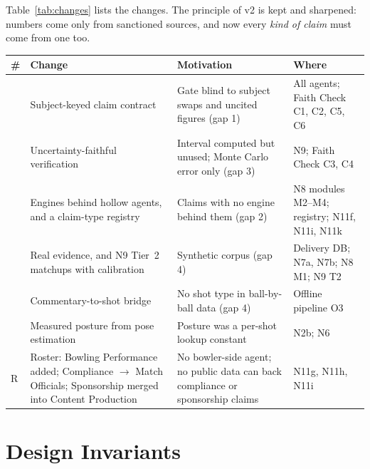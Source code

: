 \documentclass[11pt,a4paper]{article}
\begin{document}
\noindent Table~\ref{tab:changes} lists the changes. The principle of v2 is kept
and sharpened: numbers come only from sanctioned sources, and now every
\emph{kind of claim} must come from one too.

\begin{center}
\footnotesize
\renewcommand{\arraystretch}{1.25}
\begin{tabular}{@{}>{\raggedright\arraybackslash}p{0.4cm}
                  >{\raggedright\arraybackslash}p{4.4cm}
                  >{\raggedright\arraybackslash}p{6.6cm}
                  >{\raggedright\arraybackslash}p{3.6cm}@{}}
\toprule
\textbf{\#} & \textbf{Change} & \textbf{Motivation} & \textbf{Where} \\
\midrule
1 & Subject-keyed claim contract & Gate blind to subject swaps and uncited figures (gap 1) & All agents; Faith Check C1, C2, C5, C6 \\
2 & Uncertainty-faithful verification & Interval computed but unused; Monte Carlo error only (gap 3) & N9; Faith Check C3, C4 \\
3 & Engines behind hollow agents, and a claim-type registry & Claims with no engine behind them (gap 2) & N8 modules M2--M4; registry; N11f, N11i, N11k \\
4 & Real evidence, and N9 Tier~2 matchups with calibration & Synthetic corpus (gap 4) & Delivery DB; N7a, N7b; N8 M1; N9 T2 \\
5 & Commentary-to-shot bridge & No shot type in ball-by-ball data (gap 4) & Offline pipeline O3 \\
6 & Measured posture from pose estimation & Posture was a per-shot lookup constant & N2b; N6 \\
R & Roster: Bowling Performance added; Compliance $\rightarrow$ Match Officials; Sponsorship merged into Content Production & No bowler-side agent; no public data can back compliance or sponsorship claims & N11g, N11h, N11i \\
\bottomrule
\end{tabular}
\label{tab:changes}
\end{center}

\section{Design Invariants}
\label{sec:invariants}
\end{document}
